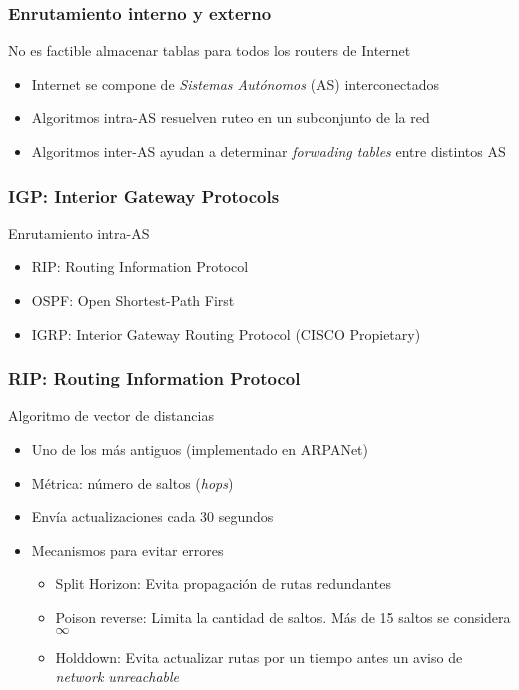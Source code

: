 \documentclass[letter]{beamer}
\begin{document}
\begin{frame}
  \frametitle{Enrutamiento interno y externo}
  
  No es factible almacenar tablas para todos los routers de Internet
  \begin{itemize}
    \item Internet se compone de {\em Sistemas Autónomos} (AS) interconectados
    \item Algoritmos intra-AS resuelven ruteo en un subconjunto de la red
    \item Algoritmos inter-AS ayudan a determinar {\em forwading tables} entre distintos AS
  \end{itemize}
\end{frame}
\begin{frame}
  \frametitle{IGP: Interior Gateway Protocols}

  Enrutamiento intra-AS
  \begin{itemize}
    \item RIP: Routing Information Protocol
    \item OSPF: Open Shortest-Path First
    \item IGRP: Interior Gateway Routing Protocol (CISCO Propietary)
  \end{itemize}

\end{frame}
\begin{frame}
  \frametitle{RIP: Routing Information Protocol}

  Algoritmo de vector de distancias
  \begin{itemize}
    \item Uno de los más antiguos (implementado en ARPANet)
    \item Métrica: número de saltos ({\em hops})
    \item Envía actualizaciones cada 30 segundos
    \item Mecanismos para evitar errores
      \begin{itemize}
        \item Split Horizon: Evita propagación de rutas redundantes
        \item Poison reverse: Limita la cantidad de saltos. Más de 15 saltos se considera $\infty$
        \item Holddown: Evita actualizar rutas por un tiempo antes un aviso de {\em network unreachable}
      \end{itemize}
  \end{itemize}

\end{frame}
\end{document}
